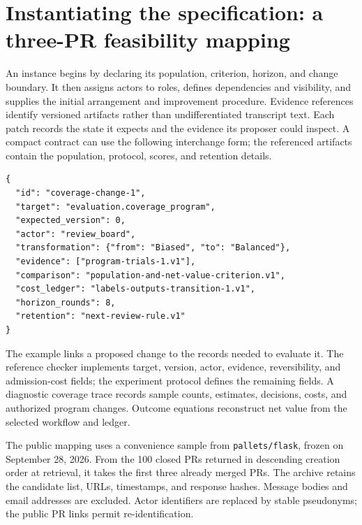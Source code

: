 \section{Instantiating the specification: a three-PR feasibility mapping}
\label{app:records}
An instance begins by declaring its population, criterion, horizon, and change boundary. It then assigns actors to roles, defines dependencies and visibility, and supplies the initial arrangement and improvement procedure. Evidence references identify versioned artifacts rather than undifferentiated transcript text. Each patch records the state it expects and the evidence its proposer could inspect. A compact contract can use the following interchange form; the referenced artifacts contain the population, protocol, scores, and retention details.
\begin{lstlisting}
{
  "id": "coverage-change-1",
  "target": "evaluation.coverage_program",
  "expected_version": 0,
  "actor": "review_board",
  "transformation": {"from": "Biased", "to": "Balanced"},
  "evidence": ["program-trials-1.v1"],
  "comparison": "population-and-net-value-criterion.v1",
  "cost_ledger": "labels-outputs-transition-1.v1",
  "horizon_rounds": 8,
  "retention": "next-review-rule.v1"
}
\end{lstlisting}
The example links a proposed change to the records needed to evaluate it. The reference checker implements target, version, actor, evidence, reversibility, and admission-cost fields; the experiment protocol defines the remaining fields. A diagnostic coverage trace records sample counts, estimates, decisions, costs, and authorized program changes. Outcome equations reconstruct net value from the selected workflow and ledger.

The public mapping uses a convenience sample from \texttt{pallets/flask}, frozen on September 28, 2026. From the 100 closed PRs returned in descending creation order at retrieval, it takes the first three already merged PRs. The archive retains the candidate list, URLs, timestamps, and response hashes. Message bodies and email addresses are excluded. Actor identifiers are replaced by stable pseudonyms; the public PR links permit re-identification.

